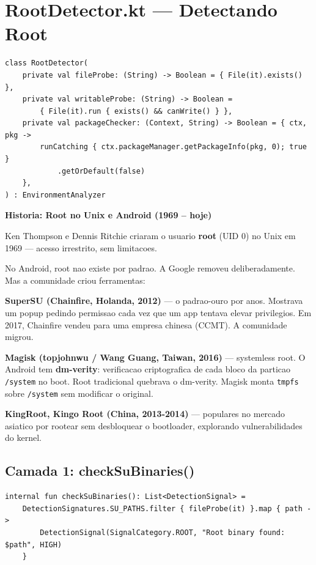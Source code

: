 \documentclass[12pt,a4paper]{article}
\begin{document}
\newpage

\section{RootDetector.kt --- Detectando Root}

\begin{lstlisting}
class RootDetector(
    private val fileProbe: (String) -> Boolean = { File(it).exists() },
    private val writableProbe: (String) -> Boolean =
        { File(it).run { exists() && canWrite() } },
    private val packageChecker: (Context, String) -> Boolean = { ctx, pkg ->
        runCatching { ctx.packageManager.getPackageInfo(pkg, 0); true }
            .getOrDefault(false)
    },
) : EnvironmentAnalyzer
\end{lstlisting}

\begin{historybox}
\textbf{Historia: Root no Unix e Android (1969 -- hoje)}

Ken Thompson e Dennis Ritchie criaram o usuario \textbf{root} (UID 0) no Unix
em 1969 --- acesso irrestrito, sem limitacoes.

No Android, root nao existe por padrao. A Google removeu deliberadamente.
Mas a comunidade criou ferramentas:

\medskip
\textbf{SuperSU (Chainfire, Holanda, 2012)} --- o padrao-ouro por anos.
Mostrava um popup pedindo permissao cada vez que um app tentava elevar privilegios.
Em 2017, Chainfire vendeu para uma empresa chinesa (CCMT). A comunidade migrou.

\medskip
\textbf{Magisk (topjohnwu / Wang Guang, Taiwan, 2016)} --- systemless root.
O Android tem \textbf{dm-verity}: verificacao criptografica de cada bloco da
particao \texttt{/system} no boot. Root tradicional quebrava o dm-verity.
Magisk monta \texttt{tmpfs} sobre \texttt{/system} sem modificar o original.

\medskip
\textbf{KingRoot, Kingo Root (China, 2013-2014)} --- populares no mercado
asiatico por rootear sem desbloquear o bootloader, explorando vulnerabilidades
do kernel.
\end{historybox}

\subsection{Camada 1: checkSuBinaries()}

\begin{lstlisting}
internal fun checkSuBinaries(): List<DetectionSignal> =
    DetectionSignatures.SU_PATHS.filter { fileProbe(it) }.map { path ->
        DetectionSignal(SignalCategory.ROOT, "Root binary found: $path", HIGH)
    }
\end{lstlisting}
\end{document}
